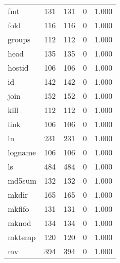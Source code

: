 \begin{longtable}{lp{3.0cm}p{3.0cm}p{3.0cm}p{3.0cm}}
fmt       &                     131 &              131 &                 0 &                        1.000 \\
fold      &                     116 &              116 &                 0 &                        1.000 \\
groups    &                     112 &              112 &                 0 &                        1.000 \\
head      &                     135 &              135 &                 0 &                        1.000 \\
hostid    &                     106 &              106 &                 0 &                        1.000 \\
id        &                     142 &              142 &                 0 &                        1.000 \\
join      &                     152 &              152 &                 0 &                        1.000 \\
kill      &                     112 &              112 &                 0 &                        1.000 \\
link      &                     106 &              106 &                 0 &                        1.000 \\
ln        &                     231 &              231 &                 0 &                        1.000 \\
logname   &                     106 &              106 &                 0 &                        1.000 \\
ls        &                     484 &              484 &                 0 &                        1.000 \\
md5sum    &                     132 &              132 &                 0 &                        1.000 \\
mkdir     &                     165 &              165 &                 0 &                        1.000 \\
mkfifo    &                     131 &              131 &                 0 &                        1.000 \\
mknod     &                     134 &              134 &                 0 &                        1.000 \\
mktemp    &                     120 &              120 &                 0 &                        1.000 \\
mv        &                     394 &              394 &                 0 &                        1.000 \\

\end{longtable}
